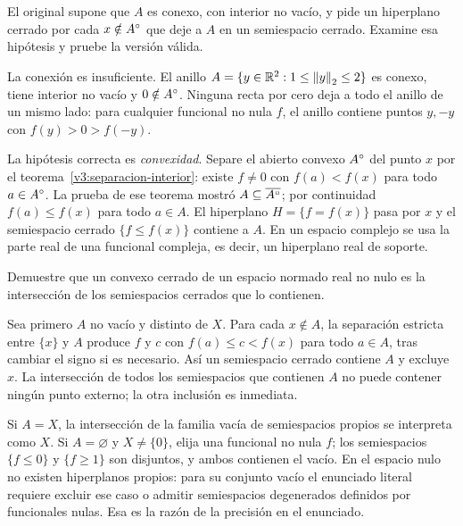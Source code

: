 \begin{ejercicio}\label{ej:v3-l05-7}
El original supone que $A$ es conexo, con interior no vacío, y pide un hiperplano cerrado por cada $x\notin A^{\circ}$ que deje a $A$ en un semiespacio cerrado. Examine esa hipótesis y pruebe la versión válida.
\end{ejercicio}
\begin{solucion}
La conexión es insuficiente. El anillo $A=\{y\in\mathbb R^2:1\leq\left\lVert y\right\rVert_2\leq2\}$ es conexo, tiene interior no vacío y $0\notin A^{\circ}$. Ninguna recta por cero deja a todo el anillo de un mismo lado: para cualquier funcional no nula $f$, el anillo contiene puntos $y,-y$ con $f(y)>0>f(-y)$.

La hipótesis correcta es \emph{convexidad}. Separe el abierto convexo $A^{\circ}$ del punto $x$ por el teorema~\ref{v3:separacion-interior}: existe $f\ne0$ con $f(a)<f(x)$ para todo $a\in A^{\circ}$. La prueba de ese teorema mostró $A\subseteq\overline{A^{\circ}}$; por continuidad $f(a)\leq f(x)$ para todo $a\in A$. El hiperplano $H=\{f=f(x)\}$ pasa por $x$ y el semiespacio cerrado $\{f\leq f(x)\}$ contiene a $A$. En un espacio complejo se usa la parte real de una funcional compleja, es decir, un hiperplano real de soporte.
\end{solucion}

\begin{ejercicio}\label{ej:v3-l05-8}
Demuestre que un convexo cerrado de un espacio normado real no nulo es la intersección de los semiespacios cerrados que lo contienen.
\end{ejercicio}
\begin{solucion}
Sea primero $A$ no vacío y distinto de $X$. Para cada $x\notin A$, la separación estricta entre $\{x\}$ y $A$ produce $f$ y $c$ con $f(a)\leq c<f(x)$ para todo $a\in A$, tras cambiar el signo si es necesario. Así un semiespacio cerrado contiene $A$ y excluye $x$. La intersección de todos los semiespacios que contienen $A$ no puede contener ningún punto externo; la otra inclusión es inmediata.

Si $A=X$, la intersección de la familia vacía de semiespacios propios se interpreta como $X$. Si $A=\varnothing$ y $X\ne\{0\}$, elija una funcional no nula $f$; los semiespacios $\{f\leq0\}$ y $\{f\geq1\}$ son disjuntos, y ambos contienen el vacío. En el espacio nulo no existen hiperplanos propios: para su conjunto vacío el enunciado literal requiere excluir ese caso o admitir semiespacios degenerados definidos por funcionales nulas. Esa es la razón de la precisión en el enunciado.
\end{solucion}

